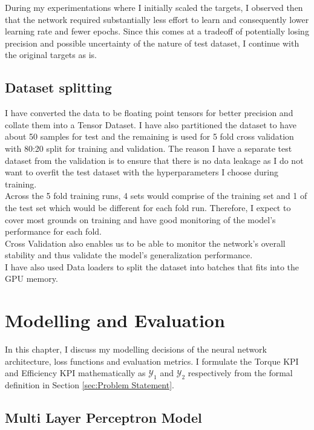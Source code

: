 \documentclass{report} %
\begin{document}
During my experimentations where I initially scaled the targets, I observed then that the network required substantially less effort to learn and consequently lower 
learning rate and fewer epochs.
Since this comes at a tradeoff of potentially losing precision and possible uncertainty of the nature of test dataset, I continue with the original targets as is.

\section{Dataset splitting}\label{sec:Dataset splitting}
I have converted the data to be floating point tensors for better precision and collate them into a Tensor Dataset.
I have also partitioned the dataset to have about 50 samples for test and the remaining is used for 5 fold cross validation with 80:20 split for training and validation. 
The reason I have a separate test dataset from the validation is to ensure that there is no data leakage as I do not want to 
overfit the test dataset with the hyperparameters I choose during training. \\

Across the 5 fold training runs, 4 sets would comprise of the training set and 1 of the test set which would be different for each fold run.
Therefore, I expect to cover most grounds on training and have good monitoring of the model's performance for each fold.\\
Cross Validation also enables us to be able to monitor the network's overall stability and thus validate the model's generalization performance.\\
I have also used Data loaders to split the dataset into batches that fits into the \ac{GPU} memory.

\chapter{Modelling and Evaluation}
In this chapter, I discuss my modelling decisions of the neural network architecture, loss functions and evaluation metrics. I formulate the Torque \ac{KPI} and Efficiency 
\ac{KPI} mathematically as $\mathcal{Y}_1$ and $\mathcal{Y}_2$ respectively from the formal definition in Section \ref{sec:Problem Statement}.

\section{Multi Layer Perceptron Model}\label{sec:MLP Model}
\end{document}
